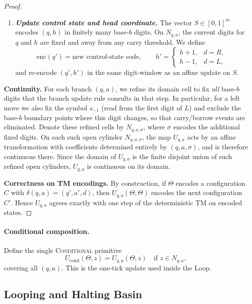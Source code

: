 \documentclass[12pt]{article}
\theoremstyle{definition}
\theoremstyle{plain}
\begin{document}
\begin{proof}
\begin{enumerate}
\item \textbf{\textit{Update control state and head coordinate.}}  
   The vector \(S\in[0,1]^m\) encodes \((q,h)\) in finitely many base‑\(b\) digits.  On \(N_{q,a}\), the current digits for \(q\) and \(h\) are fixed and away from any carry threshold.  We define
   \[
     \mathrm{enc}(q') 
     = \text{new control‐state code},
     \qquad
     h' = 
     \begin{cases}
       h+1, & d=R,\\
       h-1, & d=L,
     \end{cases}
   \]
   and re‑encode \((q',h')\) in the same digit‐window as an affine update on \(S\).
\end{enumerate}
\medskip
\noindent\textbf{Continuity.}  
For each branch $(q,a)$, we refine its domain cell to fix \emph{all} base-$b$ digits that the branch update rule consults in that step.  
In particular, for a left move we also fix the symbol $s_{-1}$ (read from the first digit of $L$) and exclude the base-$b$ boundary points where this digit changes, so that carry/borrow events are eliminated.  
Denote these refined cells by $N_{q,a,\sigma}$, where $\sigma$ encodes the additional fixed digits.  
On each such open cylinder $N_{q,a,\sigma}$, the map $U_{q,a}$ acts by an affine transformation with coefficients determined entirely by $(q,a,\sigma)$, and is therefore continuous there.  
Since the domain of $U_{q,a}$ is the finite disjoint union of such refined open cylinders, $U_{q,a}$ is continuous on its domain.


\medskip
\noindent\textbf{Correctness on TM encodings.}  
By construction, if \(\Theta\) encodes a configuration \(C\) with \(\delta(q,a)=(q',a',d)\), then \(U_{q,a}(\Theta,\Theta)\) encodes the next configuration \(C'\).  Hence \(U_{q,a}\) agrees exactly with one step of the deterministic TM on encoded states.

\end{proof}


\paragraph{Conditional composition.}
Define the single \textsc{Conditional} primitive
\[
  U_{\mathrm{cond}}(\Theta,z)
  = U_{q,a}(\Theta,z)
  \quad\text{if }z\in N_{q,a},
\]
covering all \((q,a)\).  This is the one‑tick update used inside the Loop.

\subsection{Looping and Halting Basin}
\label{subsec:loop-halting}
\end{document}
